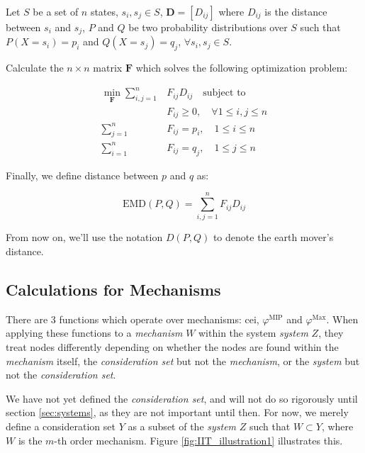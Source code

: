 \begin{definition}
	\label{def:emd}
	 Let $S$ be a set of $n$ states, $s_i, s_j \in S$, $\mathbf{D} = \left[ D_{ij}\right]$ where $D_{ij}$ is the distance between $s_i$ and $s_j$, $P$ and $Q$ be two probability distributions over $S$ such that $P(X = s_i) = p_i$ and $Q(X=s_j) = q_j$, $\forall s_i, s_j \in S$. 
	
	Calculate the $n\times n$ matrix $\mathbf{F}$ which solves the following optimization problem:
	
	\begin{align}
	\label{eq:EMD1}
	\min \limits_{\mathbf{F}}\sum \limits_{i,j=1}^n &F_{ij} D_{ij}\quad \text{subject to}\\
	&F_{ij}\geq 0,\quad \forall 1 \leq i,j \leq n\\
	\sum \limits_{j=1}^n &F_{ij} = p_i,\quad 1 \leq i \leq n\\
	\sum \limits_{i=1}^n &F_{ij} = q_j,\quad 1 \leq j \leq n
	\end{align}
	
	Finally, we define distance between $p$ and $q$ as: 
	
	\begin{equation}
	\label{def:EMD}
	\text{EMD}(P, Q) = \sum \limits_{i,j=1}^{n} F_{ij} D_{ij}
	\end{equation}
\end{definition}

From now on, we'll use the notation $D(P,Q)$ to denote the earth mover's distance.

\subsection{Calculations for Mechanisms}\label{sec:little_phi}
There are 3 functions which operate over mechanisms: cei, $\varphi^{\text{MIP}}$ and $\varphi^{\text{Max}}$. When applying these functions to a \textit{mechanism} $W$ within the system \textit{system} $Z$, they treat nodes differently depending on whether the nodes are found within the \textit{mechanism} itself, the \textit{consideration set} but not the \textit{mechanism}, or the \textit{system} but not the \textit{consideration set}.

We have not yet defined the \textit{consideration set}, and will not do so rigorously until section \ref{sec:systems}, as they are not important until then. For now, we merely define a consideration set $Y$ as a subset of the \textit{system} $Z$ such that $W \subset Y$, where $W$ is the $m$-th order mechanism. Figure \ref{fig:IIT_illustration1} illustrates this.

